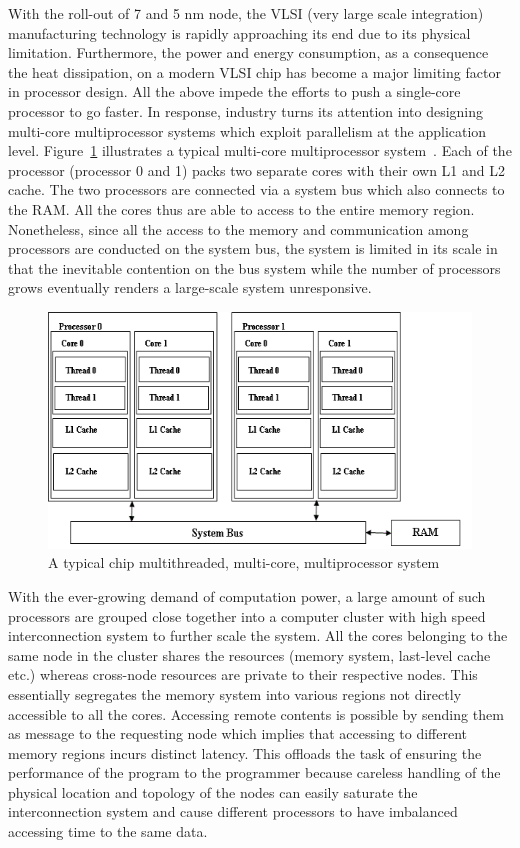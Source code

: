 With the roll-out of 7 and 5 nm node, the VLSI (very large scale integration) 
manufacturing technology is rapidly approaching its end due to its physical 
limitation. Furthermore, the power and energy consumption, as a consequence the 
heat dissipation, on a modern VLSI chip has become a major limiting factor in 
processor design. All the above impede the efforts to push a single-core 
processor to go faster. In response, industry turns its attention into designing 
multi-core multiprocessor systems which exploit parallelism at the application 
level. Figure~\ref{fig:multicore} illustrates a typical multi-core 
multiprocessor system~\cite{ibm_multicore}. Each of the processor (processor 0 
and 1) packs two separate cores with their own L1 and L2 cache. The two 
processors are connected via a system bus which also connects to the RAM. All 
the cores thus are able to access to the entire memory region. Nonetheless, 
since all the access to the memory and communication among processors are 
conducted on the system bus, the system is limited in its scale in that the 
inevitable contention on the bus system while the number of processors grows 
eventually renders a large-scale system unresponsive.
\begin{figure}[H]
    \centerline{\includegraphics[scale=0.50]{background/figs/multicore_mp_system.png}}
    \caption{A typical chip multithreaded, multi-core, multiprocessor system}
    \label{fig:multicore}
\end{figure}

With the ever-growing demand of computation power, a large amount of such 
processors are grouped close together into a computer cluster with high speed 
interconnection system to further scale the system. All the cores belonging to 
the same node in the cluster shares the resources (memory system, last-level 
cache etc.) whereas cross-node resources are private to their respective nodes.  
This essentially segregates the memory system into various regions not directly 
accessible to all the cores. Accessing remote contents is possible by sending 
them as message to the requesting node which implies that accessing to different 
memory regions incurs distinct latency.  This offloads the task of ensuring the 
performance of the program to the programmer because careless handling of the 
physical location and topology of the nodes can easily saturate the 
interconnection system and cause different processors to have imbalanced 
accessing time to the same data.

